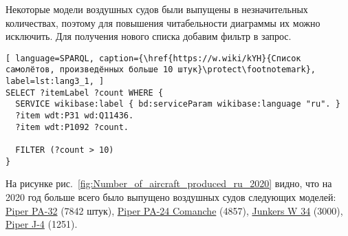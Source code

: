 
Некоторые модели воздушных судов были выпущены в незначительных количествах, поэтому для повышения читабельности диаграммы их можно исключить. Для получения нового списка добавим фильтр в запрос.

\begin{lstlisting}[ language=SPARQL, caption={\href{https://w.wiki/kYH}{Список самолётов, произведённых больше 10 штук}\protect\footnotemark}, label=lst:lang3_1, ]
SELECT ?itemLabel ?count WHERE {
  SERVICE wikibase:label { bd:serviceParam wikibase:language "ru". }
  ?item wdt:P31 wd:Q11436.
  ?item wdt:P1092 ?count.
  
  FILTER (?count > 10)
}
\end{lstlisting}



На рисунке рис.~\ref{fig:Number_of_aircraft_produced_ru_2020} видно, что на 2020 год больше всего было выпущено воздушных судов следующих моделей: \href{https://www.wikidata.org/wiki/Q2096452}{Piper PA-32} (\num{7842} штук), \href{https://www.wikidata.org/wiki/Q1860367}{Piper PA-24 Comanche} (\num{4857}), \href{https://www.wikidata.org/wiki/Q694521}{Junkers W 34} (\num{3000}), \href{https://www.wikidata.org/wiki/Q4046989}{Piper J-4} (\num{1251}).


\begin{figure*}[h]

    \setlength{\fboxsep}{0pt}%
    \setlength{\fboxrule}{1pt}%

	\caption{Количество выпущенных воздушных судов по моделям, 2020.}%
    \label{fig:Number_of_aircraft_produced_ru_2020}%
\end{figure*}


